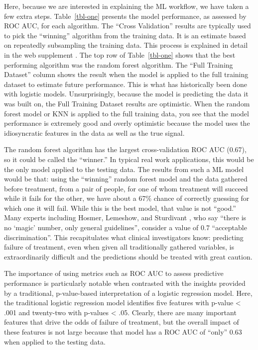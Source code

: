 \documentclass[
  number,
  preprint,
  3p,
  onecolumn]{elsarticle}
\begin{document}
Here, because we are interested in explaining the ML workflow, we have
taken a few extra steps. Table~\ref{tbl-one} presents the model
performance, as assessed by ROC AUC, for each algorithm. The ``Cross
Validation'' results are typically used to pick the ``winning''
algorithm from the training data. It is an estimate based on repeatedly
subsampling the training data. This process is explained in detail in
the web supplement \citep{balise_supplement_2025}. The top row of
Table~\ref{tbl-one} shows that the best performing algorithm was the
random forest algorithm. The ``Full Training Dataset'' column shows the
result when the model is applied to the full training dataset to
estimate future performance. This is what has historically been done
with logistic models. Unsurprisingly, because the model is predicting
the data it was built on, the Full Training Dataset results are
optimistic. When the random forest model or KNN is applied to the full
training data, you see that the model performance is extremely good and
overly optimistic because the model uses the idiosyncratic features in
the data as well as the true signal.

The random forest algorithm has the largest cross-validation ROC AUC
(0.67), so it could be called the ``winner.'' In typical real work
applications, this would be the only model applied to the testing data.
The results from such a ML model would be that: using the ``winning''
random forest model and the data gathered before treatment, from a pair
of people, for one of whom treatment will succeed while it fails for the
other, we have about a 67\% chance of correctly guessing for which one
it will fail. While this is the best model, that value is not ``good.''
Many experts including Hosmer, Lemeshow, and Sturdivant
\citep{hosmer2013}, who say ``there is no `magic' number, only general
guidelines'', consider a value of 0.7 ``acceptable discrimination''.
This recapitulates what clinical investigators know: predicting failure
of treatment, even when given all traditionally gathered variables, is
extraordinarily difficult and the predictions should be treated with
great caution.

The importance of using metrics such as ROC AUC to assess predictive
performance is particularly notable when contrasted with the insights
provided by a traditional, p-value-based interpretation of a logistic
regression model. Here, the traditional logistic regression model
identifies five features with p-value \textless{} .001 and twenty-two
with p-values \textless{} .05. Clearly, there are many important
features that drive the odds of failure of treatment, but the overall
impact of these features is not large because that model has a ROC AUC
of ``only'' 0.63 when applied to the testing data.
\end{document}
